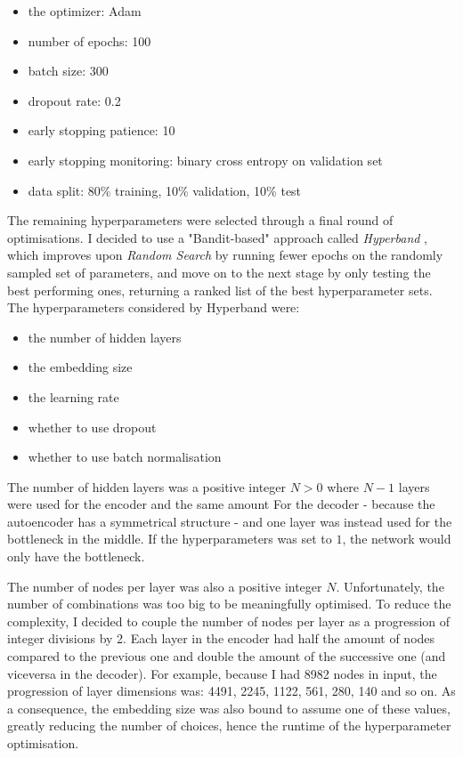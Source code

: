 \begin{itemize}
  \item the optimizer: Adam
  \item number of epochs: 100
  \item batch size: 300
  \item dropout rate: 0.2
  \item early stopping patience: 10
  \item early stopping monitoring: binary cross entropy on validation set
  \item data split: 80\% training, 10\% validation, 10\% test
\end{itemize}

The remaining hyperparameters were selected through a final round of optimisations. I decided to use a "Bandit-based" approach
called \textit{Hyperband} \cite{DBLP:journals/corr/LiJDRT16}, which improves upon \textit{Random Search}
by running fewer epochs on the randomly sampled set of parameters,
and move on to the next stage by only testing the best performing ones, returning a ranked list of the best hyperparameter sets.
The hyperparameters considered by Hyperband were:

\begin{itemize}
  \item the number of hidden layers
  \item the embedding size
  \item the learning rate
  \item whether to use dropout
  \item whether to use batch normalisation
\end{itemize}

The number of hidden layers was a positive integer $N > 0$ where $N-1$ layers were used for the encoder and the same amount For
the decoder - because the autoencoder has a symmetrical structure - and one layer was instead used for the bottleneck in the middle.
If the hyperparameters was set to $1$, the network would only have the bottleneck.

The number of nodes per layer was also a positive integer $N$. Unfortunately, the number of combinations was too big to be
meaningfully optimised. To reduce the complexity, I decided to couple the number of nodes per layer as a progression of integer divisions by 2.
Each layer in the encoder had half the amount of nodes compared to the previous one and double the amount of the successive one
(and viceversa in the decoder). For example, because I had 8982 nodes in input, the progression of layer dimensions
was: 4491, 2245, 1122, 561, 280, 140 and so on. As a consequence, the embedding size was also bound to assume one of these values,
greatly reducing the number of choices, hence the runtime of the hyperparameter optimisation.

